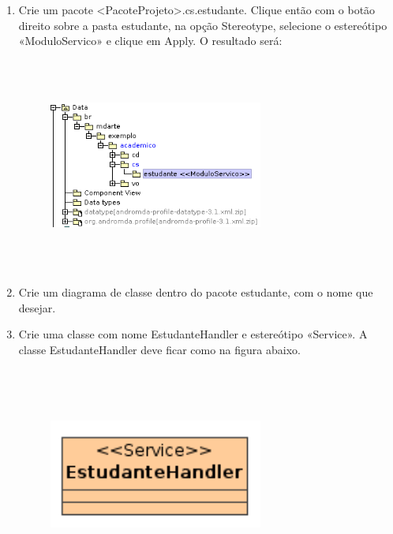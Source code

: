 \begin{enumerate}
	\item Crie um pacote <PacoteProjeto>.cs.estudante. Clique então com o botão
  	direito sobre a pasta estudante, na opção Stereotype, selecione o estereótipo
  	«ModuloServico» e clique em Apply. O resultado será:
  		\begin{figure}[!htb]
			\centering
			\includegraphics[width=200pt,height=200pt]{imgs/tutorial-mdarte-0008.png}
		\end{figure} 
	
	\item Crie um diagrama de classe dentro do pacote estudante, com o nome que
	desejar.
	
	\item Crie uma classe com nome EstudanteHandler e estereótipo «Service». A
	classe EstudanteHandler deve ficar como na figura abaixo.
		\begin{figure}[!htb]
			\centering
			\includegraphics[width=200pt,height=200pt]{imgs/tutorial-mdarte-0009.png}
		\end{figure} 
	

\end{enumerate}
